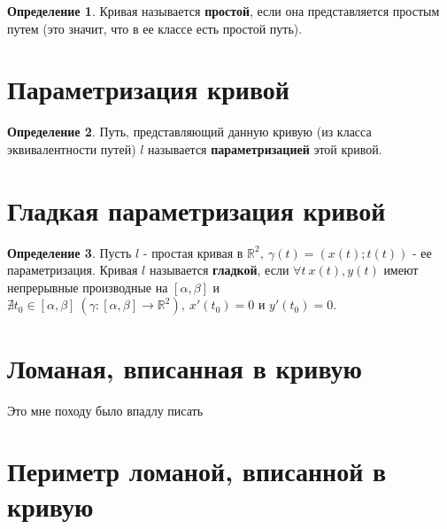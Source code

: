 \documentclass{report}
\theoremstyle{definition}
\newtheorem*{definition}{Определение}
\begin{document}
\begin{definition}
    Кривая называется \textbf{простой}, если она представляется простым путем (это значит, что в ее классе
    есть простой путь).
\end{definition}

\section{Параметризация кривой}

\begin{definition}
    Путь, представляющий данную кривую (из класса эквивалентности путей) $l$ называется
    \textbf{параметризацией} этой кривой.
\end{definition}

\section{Гладкая параметризация кривой}

\begin{definition}
    Пусть $l$ - простая кривая в $\mathbb{R}^2, \ \gamma(t) = (x(t);t(t))$ - ее параметризация.
    Кривая $l$ называется \textbf{гладкой}, если $\forall t \ x(t),y(t)$ имеют непрерывные производные
    на $[\alpha,\beta]$ и $\nexists t_0 \in [\alpha,\beta] \ (\gamma : [\alpha,\beta] \rightarrow
        \mathbb{R}^2), \ x'(t_0)=0$ и $y'(t_0) = 0$.
\end{definition}

\section{Ломаная, вписанная в кривую}

Это мне походу было впадлу писать

\section{Периметр ломаной, вписанной в кривую}
\end{document}
